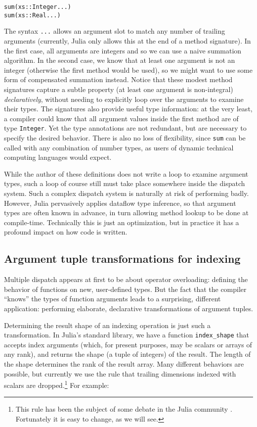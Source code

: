 \documentclass[preprint]{sigplanconf}
\newcommand{\code}[1]{\texttt{#1}}
\begin{document}
\begin{verbatim}
sum(xs::Integer...)
sum(xs::Real...)
\end{verbatim}

The syntax \code{...} allows an argument slot to match any number of trailing
arguments (currently, Julia only allows this at the end of a method signature).
In the first case, all arguments are integers and so we can use a naive
summation algorithm. In the second case, we know that at least one argument
is not an integer (otherwise the first method would be used), so we might want to use some form of compensated
summation instead. Notice that these modest method signatures
capture a subtle property (at least one argument is non-integral)
\emph{declaratively}, without needing to explicitly loop over the arguments
to examine their types. The signatures also provide useful type information:
at the very least, a compiler could know that all argument values inside
the first method are of type \code{Integer}. Yet the type annotations
are not redundant, but are necessary to specify the desired behavior. There
is also no loss of flexibility, since \code{sum} can be called with any combination
of number types, as users of dynamic technical computing languages would expect.

While the author of these definitions does not write a loop to examine
argument types, such a loop of course still must take place somewhere inside
the dispatch system. Such a complex dispatch system is naturally at risk of
performing badly. However, Julia pervasively applies dataflow type
inference, so that argument types are often known in advance, in turn
allowing method lookup to be done at compile-time. Technically this is
just an optimization, but in practice it has a profound impact on how code
is written.

\subsection{Argument tuple transformations for indexing}

Multiple dispatch appears at first to be about operator overloading:
defining the behavior of functions on new, user-defined types.
But the fact that the compiler ``knows'' the types of function arguments leads
to a surprising, different application: performing elaborate, declarative
transformations of argument tuples.

Determining the result shape of an indexing operation is just such a
transformation. In Julia's standard library, we have a function
\code{index\_shape} that accepts index arguments (which, for present
purposes, may be scalars or arrays of any rank), and returns the
shape (a tuple of integers) of the result. The length of the shape
determines the rank of the result array. Many different behaviors
are possible, but currently we use the rule that trailing dimensions
indexed with scalars are dropped.\footnote{This rule has been the subject of
some debate in the Julia community \cite{issue5949}. Fortunately it is easy to change,
as we will see.}
For example:
\end{document}
